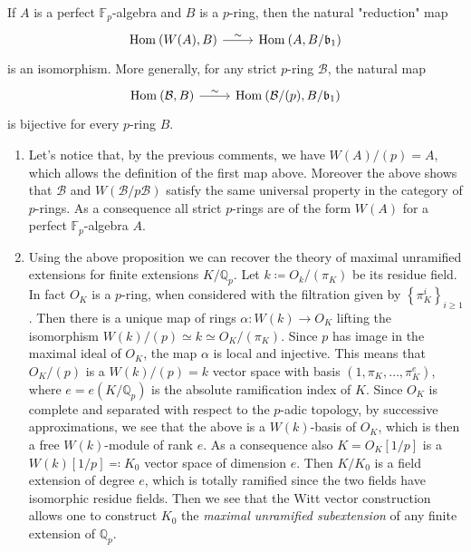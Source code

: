 \begin{prop}
	If $A$ is a perfect $\mathbb{F}_p$-algebra and $B$ is a $p$-ring,
	then the natural "reduction" map 
	\begin{equation*}
	\begin{tikzcd}
		\mathrm{Hom}_{  } \left( W(A), B \right)
		\arrow[r, "\sim", rightarrow] &
		\mathrm{Hom}_{  } \left( A, B/\mathfrak{b}_1 \right)
	\end{tikzcd}
	\end{equation*}
	is an isomorphism.
	More generally, for any strict $p$-ring $\mathcal{B}$, the natural map
	\begin{equation*}
	\begin{tikzcd}
		\mathrm{Hom}_{  } \left( \mathcal{B}, B \right)
		\arrow[r, "\sim", rightarrow] &
		\mathrm{Hom}_{  } \left( \mathcal{B}/ (p), B/\mathfrak{b}_1 \right)
	\end{tikzcd}
	\end{equation*}
	is bijective for every $p$-ring $B$.
\end{prop}


\begin{rem}[]\leavevmode\vspace{-.2\baselineskip}
\begin{enumerate}
\item Let's notice that, by the previous comments, we have
	$W(A)/ (p) = A$, which allows the definition of the first map above.
	Moreover the above shows that $\mathcal{B}$ and $W(\mathcal{B}/p \mathcal{B})$
	satisfy the same universal property in the category of $p$-rings.
	As a consequence all strict $p$-rings are of the form $W(A)$ for
	a perfect $\mathbb{F}_p$-algebra $A$.

\item Using the above proposition we can recover the theory of maximal unramified
	extensions for finite extensions $K/\mathbb{Q}_p$.
	Let $k \coloneqq O_k/ (\pi_K)$ be its residue field.
	In fact $O_K$ is a $p$-ring, when considered with the filtration
	given by $\left\{ \pi_K^i \right\}_{i \geq 1}$.
	Then there is a unique map of rings $\alpha\colon W(k) \to O_K$
	lifting the isomorphism $W(k)/ (p) \simeq k \simeq O_K/ (\pi_K)$.
	Since $p$ has image in the maximal ideal of $O_K$,
	the map $\alpha$ is local and injective.
	This means that $O_K/ (p)$ is a $W(k)/ (p) = k$ vector space
	with basis $\left(1, \pi_K, \ldots, \pi_K^e\right)$,
	where $e = e(K/\mathbb{Q}_p)$ is the absolute ramification
	index of $K$.
	Since $O_K$ is complete and separated with respect to the $p$-adic topology,
	by successive approximations, we see that the above is a
	$W(k)$-basis of $O_K$, which is then a free $W(k)$-module
	of rank $e$.
	As a consequence also $K = O_K[1/p]$ is a $W(k)[1/p] \eqqcolon K_0$
	vector space of dimension $e$.
	Then $K/K_0$ is a field extension of degree $e$, which is totally ramified
	since the two fields have isomorphic residue fields.
	Then we see that the Witt vector construction allows one to
	construct $K_0$ the {\em maximal unramified subextension} of any
	finite extension of $\mathbb{Q}_p$.
\end{enumerate}
\end{rem}



